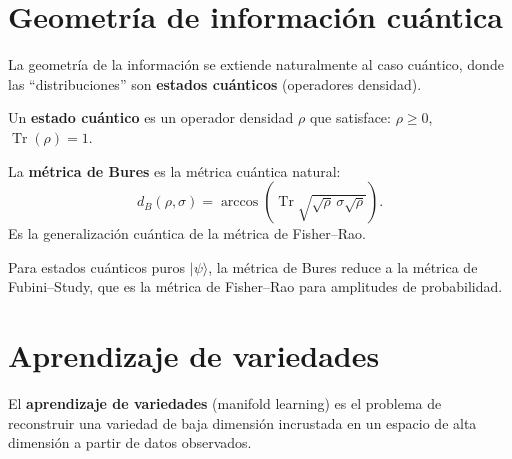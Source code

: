 \begin{center}
\end{center}

\section{Geometría de información cuántica}

La geometría de la información se extiende naturalmente al caso cuántico, donde las ``distribuciones'' son \textbf{estados cuánticos} (operadores densidad).

\begin{definition}
	Un \textbf{estado cuántico} es un operador densidad $\rho$ que satisface: $\rho \ge 0$, $\operatorname{Tr}(\rho) = 1$.
\end{definition}

\begin{definition}
	La \textbf{métrica de Bures} es la métrica cuántica natural:
	\[
	d_B(\rho, \sigma) = \arccos\left(\operatorname{Tr}\sqrt{\sqrt{\rho}\,\sigma\sqrt{\rho}}\right).
	\]
	Es la generalización cuántica de la métrica de Fisher--Rao.
\end{definition}

\begin{theorem}
	Para estados cuánticos puros $|\psi\rangle$, la métrica de Bures reduce a la métrica de Fubini--Study, que es la métrica de Fisher--Rao para amplitudes de probabilidad.
\end{theorem}

\section{Aprendizaje de variedades}

\begin{definition}
	El \textbf{aprendizaje de variedades} (manifold learning) es el problema de reconstruir una variedad de baja dimensión incrustada en un espacio de alta dimensión a partir de datos observados.
\end{definition}

